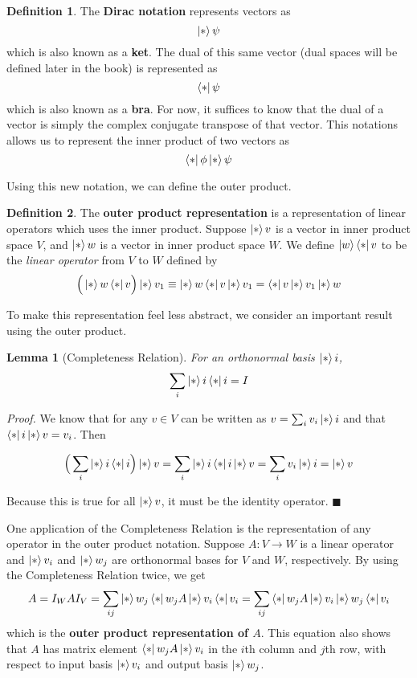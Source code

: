 \documentclass[a4paper,10pt]{book}
\theoremstyle{plain}
\theoremstyle{plain}
\newtheorem{lemma}[theorem]{Lemma}
\newenvironment{lproof}{\textsl{Proof.}}{\hfill$\blacksquare$}
\theoremstyle{definition}
\newtheorem{definition}{Definition}[section]
\begin{document}
\begin{definition}
The \textbf{Dirac notation} represents vectors as 
$$\ket*{\psi}$$ which is also known as a \textbf{ket}. The dual of this same vector (dual spaces will be defined later in the book) is represented as 
$$\bra*{\psi}$$ which is also known as a \textbf{bra}. For now, it suffices to know that the dual of a vector is simply the complex conjugate transpose of that vector. This notations allows us to represent the inner product of two vectors as 
$$\bra*{\phi}\ket*{\psi}$$
\end{definition}

Using this new notation, we can define the outer product. 

\begin{definition}
The \textbf{outer product representation} is a representation of linear operators which uses the inner product. Suppose $\ket*{v}$ is a vector in inner product space $V$, and $\ket*{w}$ is a vector in inner product space $W$. We define $\ket{w} \bra*{v}$ to be the \textit{linear operator} from $V$ to $W$ defined by 
$$\Big(\ket*{w} \bra*{v} \Big) \ket*{v_{1}} \equiv \ket*{w} \bra*{v} \ket*{v_{1}} = \bra*{v} \ket*{v_{1}} \ket*{w}$$
\end{definition}

To make this representation feel less abstract, we consider an important result using the outer product. 

\begin{lemma}[Completeness Relation]
For an orthonormal basis $\ket*{i}$, 
$$\sum_{i} \ket*{i} \bra*{i} = I$$
\end{lemma}

\begin{lproof}
We know that for any $v \in V$ can be written as $v = \sum_{i} v_{i} \ket*{i}$ and that $\bra*{i} \ket*{v} = v_{i}$. Then 

$$\Big( \sum_{i} \ket*{i} \bra*{i} \Big) \ket*{v} = \sum_{i} \ket*{i} \bra*{i} \ket*{v} = \sum_{i} v_{i} \ket*{i} = \ket*{v}$$

Because this is true for all $\ket*{v}$, it must be the identity operator. 
\end{lproof}

One application of the Completeness Relation is the representation of any operator in the outer product notation. Suppose $A: V \rightarrow W$ is a linear operator and $\ket*{v_{i}}$ and $\ket*{w_{j}}$ are orthonormal bases for $V$ and $W$, respectively. By using the Completeness Relation twice, we get
$$A = I_{W} A I_{V} = \sum_{ij} \ket*{w_{j}} \bra*{w_{j}} A \ket*{v_{i}} \bra*{v_{i}} = \sum_{ij} \bra*{w_{j}} A \ket*{v_{i}} \ket*{w_{j}} \bra*{v_{i}}$$
which is the \textbf{outer product representation of $A$}. This equation also shows that $A$ has matrix element $\bra*{w_{j}}A\ket*{v_{i}}$ in the $i$th column and $j$th row, with respect to input basis $\ket*{v_{i}}$ and output basis $\ket*{w_{j}}$.
\end{document}
